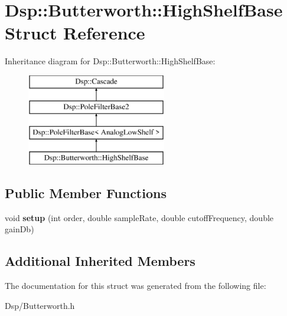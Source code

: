\hypertarget{structDsp_1_1Butterworth_1_1HighShelfBase}{\section{Dsp\-:\-:Butterworth\-:\-:High\-Shelf\-Base Struct Reference}
\label{structDsp_1_1Butterworth_1_1HighShelfBase}
}
Inheritance diagram for Dsp\-:\-:Butterworth\-:\-:High\-Shelf\-Base\-:\begin{figure}[H]
\begin{center}
\leavevmode
\includegraphics[height=4.000000cm]{structDsp_1_1Butterworth_1_1HighShelfBase}
\end{center}
\end{figure}
\subsection*{Public Member Functions}
\begin{DoxyCompactItemize}
\item 
\hypertarget{structDsp_1_1Butterworth_1_1HighShelfBase_a53bac2d6e911c4eb3374f69e57cbac4b}{void {\bfseries setup} (int order, double sample\-Rate, double cutoff\-Frequency, double gain\-Db)}\label{structDsp_1_1Butterworth_1_1HighShelfBase_a53bac2d6e911c4eb3374f69e57cbac4b}

\end{DoxyCompactItemize}
\subsection*{Additional Inherited Members}


The documentation for this struct was generated from the following file\-:\begin{DoxyCompactItemize}
\item 
Dsp/Butterworth.\-h\end{DoxyCompactItemize}

